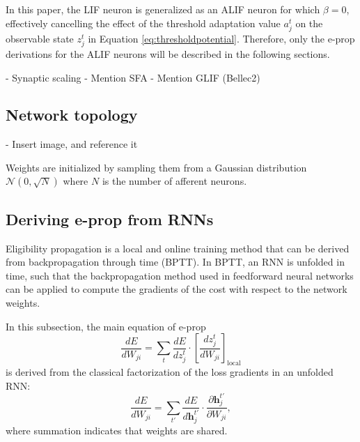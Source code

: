             In this paper, the LIF neuron is generalized as an ALIF neuron for which $\beta=0$, effectively cancelling the effect of the threshold adaptation value $a^t_j$ on the observable state $z^t_j$ in Equation \ref{eq:thresholdpotential}.
            Therefore, only the e-prop derivations for the ALIF neurons will be described in the following sections.

            \begin{tcolorbox}[colback=orange]
            - Synaptic scaling
            - Mention SFA
              - Mention GLIF (Bellec2)

            \end{tcolorbox}


    \subsection{Network topology}

        \begin{tcolorbox}[colback=orange]
          - Insert image, and reference it
        \end{tcolorbox}
        Weights are initialized by sampling them from a Gaussian distribution $\mathcal{N}\left(0, \sqrt{N}\right)$ where $N$ is the number of afferent neurons.


    \subsection{Deriving e-prop from RNNs}\label{sec:derivefromBPTT}
        Eligibility propagation is a local and online training method that can be derived from backpropagation through time (BPTT).
        In BPTT, an RNN is unfolded in time, such that the backpropagation method used in feedforward neural networks can be applied to compute the gradients of the cost with respect to the network weights.

        In this subsection, the main equation of e-prop
        \begin{equation}
        \frac{dE}{dW_{ji}} =
        \sum_t\frac{dE}{dz_j^t}\cdot\left[\frac{dz_j^t}{dW_{ji}}\right]_\text{local}
        \end{equation}
        is derived from the classical factorization of the loss gradients in an unfolded RNN:
        \begin{equation}\label{eq:clafac}
        \frac{dE}{dW_{ji}} = \sum_{t'}\frac{dE}{d\mathbf{h}_j^{t'}}\cdot\frac{\partial \mathbf{h}_j^{t'}}{\partial W_{ji}},
        \end{equation}
        where summation indicates that weights are shared.

